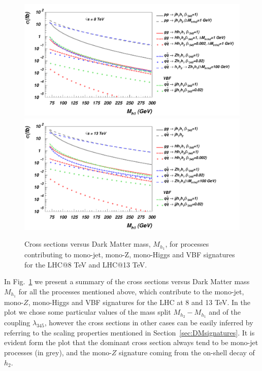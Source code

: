 \documentclass[12pt,a4paper]{article}
\begin{document}
\begin{figure}[htb]
\hskip 3cm\includegraphics[height=0.4\textheight]{sigma_vs_mh1_new_8tev.pdf} 
\vskip -0.2cm
\hskip 3cm\includegraphics[trim={0 0 10.5cm 0},clip,height=0.4\textheight]{sigma_vs_mh1_new_13tev.pdf} 
\vskip -0.2cm
\caption{ Cross sections versus
Dark Matter mass, $M_{h_1}$, for  processes
contributing to mono-jet, mono-Z, mono-Higgs and VBF signatures
for the LHC@8 TeV and  LHC@13 TeV.}
\label{fig:cs}
\end{figure}
%

In Fig.~\ref{fig:cs} we present a summary of the cross sections versus
Dark Matter mass $M_{h_1}$ for all the processes mentioned above, 
which contribute to the mono-jet, mono-$Z$, mono-Higgs and VBF signatures
for the LHC at 8 and 13 TeV.
In the plot we chose some particular values of the mass split $M_{h_2} - M_{h_1}$
and of the coupling $\lambda_{345}$, however the cross sections in other cases can be easily inferred
by referring to the scaling properties mentioned in Section~\ref{sec:DMsignatures}.
It is evident form the plot that the dominant cross section always tend to be mono-jet processes (in grey), and the mono-$Z$ signature coming from the on-shell decay of $h_2$.
\end{document}
